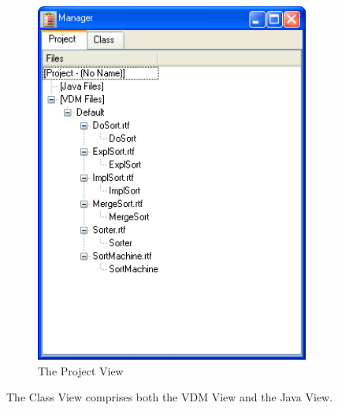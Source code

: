 \documentclass[\pformat,12pt]{article}
\newcommand{\guicmd}[1]{{\sf #1}}
\begin{document}
\begin{figure}[tbh]
\begin{center}
\mbox{}
\includegraphics[width=9cm]{projectView-ppENG.png}
\caption{The Project View}
\label{fig:projectView}
\end{center}
\end{figure}


The \guicmd{Class View} comprises both the \guicmd{VDM View} and the
\guicmd{Java View}.
\end{document}
